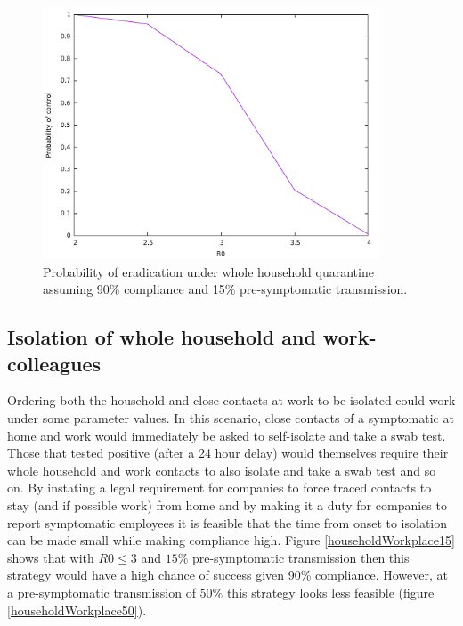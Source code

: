 \documentclass{article}
\begin{document}
\begin{figure}
\begin{center}
\includegraphics[width = 10cm]{householdQuarantineR0.pdf}
\end{center}
\caption{Probability of eradication under whole household quarantine assuming 90\% compliance and 15\% pre-symptomatic transmission.}
\label{householdQuarantine}
\end{figure}

\subsection{Isolation of whole household and work-colleagues}

Ordering both the household and close contacts at work to be isolated could work under some parameter values. In this scenario, close contacts of a symptomatic at home and work would immediately be asked to self-isolate and take a swab test. Those that tested positive (after a 24 hour delay) would themselves require their whole household and work contacts to also isolate and take a swab test and so on. By instating a legal requirement for companies to force traced contacts to stay (and if possible work) from home and by making it a duty for companies to report symptomatic employees it is feasible that the time from onset to isolation can be made small while making compliance high. Figure \ref{householdWorkplace15} shows that with $R0 \le 3$ and $15\%$ pre-symptomatic transmission then this strategy would have a high chance of success given 90\% compliance. However, at a pre-symptomatic transmission of $50\%$ this strategy looks less feasible (figure \ref{householdWorkplace50}).
\end{document}
